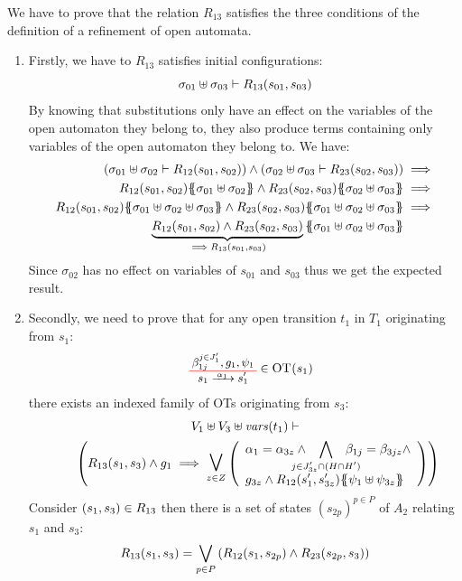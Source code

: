 \documentclass[runningheads]{llncs}
\begin{document}
We have to prove that the relation $R_{13}$ satisfies the three conditions of the definition of a refinement of open automata.
\begin{enumerate}
\item Firstly, we have to $R_{13}$ satisfies initial configurations:
\[\sigma_{01} \uplus \sigma_{03} \vdash R_{13} {\left(s_{01}, s_{03}\right)}\]
By knowing that substitutions only have an effect on the variables of the open automaton they belong to, they also produce terms containing only variables of the open automaton they belong to. We have:
\begin{align*}
\mpar{\sigma_{01} \uplus \sigma_{02} \vdash R_{12}\mpar{s_{01}, s_{02}}} \wedge \mpar
{\sigma_{02} \uplus \sigma_{03} \vdash R_{23}\mpar{s_{02}, s_{03}}}&\implies\\
R_{12}\mpar{s_{01},s_{02}}\psubst{\sigma_{01} \uplus \sigma_{02}} \wedge R_{23}\mpar{s_{02}, s_{03}}\psubst{\sigma_{02} \uplus \sigma_{03}}&\implies\\
R_{12}\mpar{s_{01},s_{02}}\psubst{\sigma_{01} \uplus \sigma_{02} \uplus \sigma_{03}} \wedge R_{23}\mpar{s_{02}, s_{03}}\psubst{\sigma_{01} \uplus \sigma_{02} \uplus \sigma_{03}}&\implies\\ 
\underbrace{R_{12}\mpar{s_{01},s_{02}}\wedge R_{23}\mpar{s_{02}, s_{03}}}_{\implies R_{13} \mpar{s_{01}, s_{03}}}\psubst{\sigma_{01} \uplus \sigma_{02} \uplus \sigma_{03}} %
 \end{align*}
Since $\sigma_{02}$ has no effect on variables of $s_{01}$ and $s_{03}$ thus we get the expected result.

\item Secondly, we need to prove that for any open transition $t_1$ in $T_1$  originating from $s_1$:
\begin{align*}
\OTx{1}{}{1}{1} \in \fOT{s_1}
\end{align*}
there exists an indexed family of OTs originating from $s_{3}$: 
\begin{multline*}
V_1 \uplus  V_3 \uplus \fvars{t_1}
\vdash\\\hspace{2em}
\mpar{R_{13}\mpar{s_1, s_3} \wedge g_1 \implies 
\operatorname*{\bigsymb{\bigvee}}_{z \in Z}
\mpar{\everymath{\displaystyle}
\begin{array}{l}
\alpha_1=\alpha_{3z}\wedge \bigwedge_\subbox{j \in J'_{3z} \cap (H\cap H')} \beta_{1j}=\beta_{3jz} \wedge \\g_{3z}\wedge 
{R_{12}\mpar{s'_1,s'_{3z}}}\psubst{\psi_1  \uplus \psi_{3z}}
\end{array}}}
\end{multline*}	
\medskip
 Consider ${\left(s_{1}, s_{3}\right)} \in R_{13}$ then there is a set of states $(s_{2p})^{p\in P}$ of $A_2$ relating  $s_{1}$ and $s_{3}$:
\[R_{13}(s_1,s_3)=\bigvee_{{p\in P}
}{\left(R_{12}{\left(s_1,s_{2p}\right)} \wedge R_{23}{\left(s_{2p},s_3\right)}\right)} \]


\end{enumerate}
\end{document}
